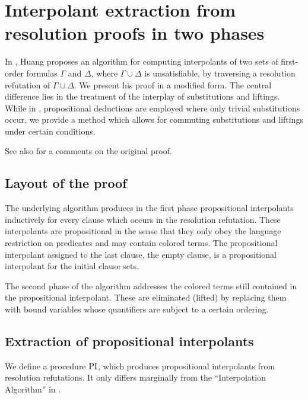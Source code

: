 \chapter{Interpolant extraction from resolution proofs in two phases}

In \cite{Huang95}, Huang proposes an algorithm for computing interpolants of two sets of first-order formulas $\Gamma$ and $\Delta$, where $\Gamma\cup\Delta$ is unsatisfiable, by traversing a resolution refutation of $\Gamma \cup \Delta$.
We present his proof in a modified form.
The central difference lies in the treatment of the interplay of substitutions and liftings. While in \cite{Huang95}, propositional deductions are employed where only trivial substitutions occur, we provide a method which allows for commuting substitutions and liftings under certain conditions.

See also \mytodo{} for a comments on the original proof.

\section{Layout of the proof}

The underlying algorithm produces in the first phase propositional interpolants inductively for every clause which occurs in the resolution refutation.
These interpolants are propositional in the sense that they only obey the language restriction on predicates and may contain colored terms.
The propositional interpolant assigned to the last clause, the empty clause, is a propositional interpolant for the initial clause sets.

The second phase of the algorithm addresses the colored terms still contained in the propositional interpolant.
These are eliminated (lifted) by replacing them with bound variables whose quantifiers are subject to a certain ordering.



\section{Extraction of propositional interpolants}

We define a procedure $\operatorname{PI}$, which produces propositional interpolants from resolution refutations. It only differs marginally from the ``Interpolation Algorithm'' in \cite{Huang95}.

